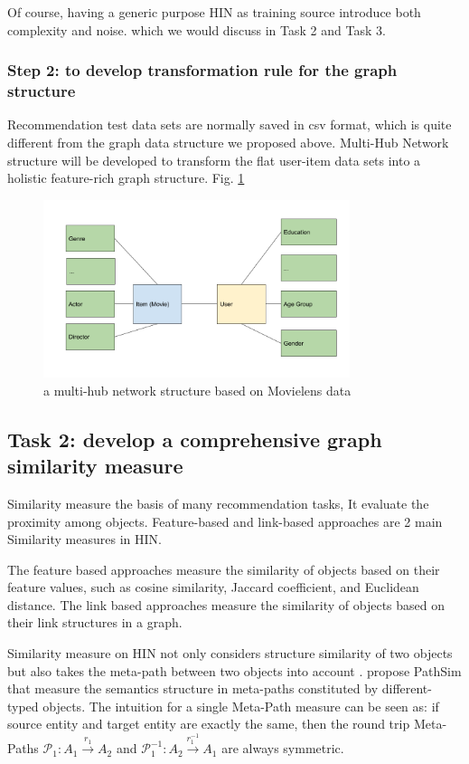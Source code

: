 Of course, having a generic purpose HIN as training source introduce both complexity and noise. which we would discuss in Task 2 and Task 3.


\subsubsection*{Step 2: to develop transformation rule for the graph structure}

Recommendation test data sets are normally saved in csv format, which is quite different from the graph data structure we proposed above. Multi-Hub Network structure will be developed to transform the flat user-item data sets into a holistic feature-rich graph structure. Fig. \ref{fig:multihub}

\begin{figure}[!t]
    \centering
    \includegraphics[width=0.8\textwidth]{figs/multi-hub.png}
    \caption{a multi-hub network structure based on Movielens data}\label{fig:multihub}
\end{figure}


\subsection{Task 2: develop a comprehensive graph similarity measure}

Similarity measure the basis of many recommendation tasks, It evaluate the proximity among objects. Feature-based and link-based approaches are 2 main Similarity measures in HIN. 

The feature based approaches measure the similarity of objects based on their feature values, such as cosine similarity, Jaccard coefficient, and Euclidean distance. The link based approaches measure the similarity of objects based on their link structures in a graph. 

Similarity measure on HIN not only considers structure similarity of two objects but also takes the meta-path between two objects into account \citep{Shi2017}. \citet{Sun2011PathSim} propose PathSim that measure the semantics structure in meta-paths constituted by different-typed objects. The intuition for a single Meta-Path measure can be seen as: if source entity and target entity are exactly the same, then the round trip Meta-Paths $\mathcal{P}_1: A_1 \xrightarrow{r_1} A_2$ and 
$\mathcal{P}_1^{-1}: A_2 \xrightarrow{r_1^{-1}} A_1$ are always symmetric.

